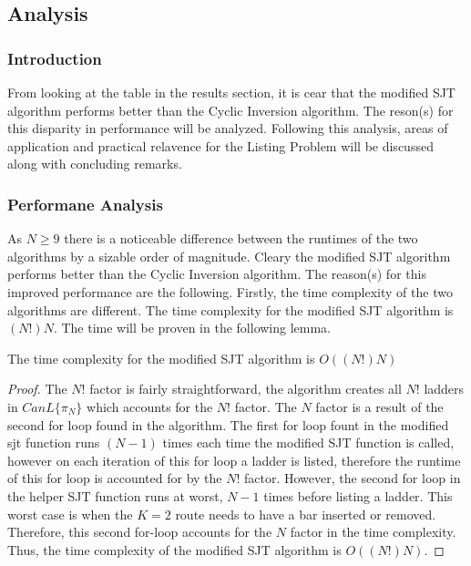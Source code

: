 
\subsection{Analysis}
    \subsubsection{Introduction}
    From looking at the table in the results section, it is cear that the modified SJT algorithm performs 
    better than the Cyclic Inversion algorithm. The reson(s) for this disparity in performance 
    will be analyzed. Following this analysis, areas of application and practical relavence for the Listing Problem 
    will be discussed along with concluding remarks.

\subsubsection{Performane Analysis}
    As $N \geq 9$ there is a noticeable difference between the runtimes of the two algorithms by a sizable order 
    of magnitude. Cleary the modified SJT algorithm performs better than the Cyclic Inversion algorithm. The reason(s) 
    for this improved performance are the following. Firstly, the time complexity of the two algorithms are different. 
    The time complexity for the modified SJT algorithm is $(N!)N$. The time will be proven in the following lemma.
    \begin{lemma}
        The time complexity for the modified SJT algorithm is $O((N!)N)$
    \end{lemma}
    \begin{proof}
        The $N!$ factor is fairly straightforward, the algorithm creates all $N!$ ladders in $CanL\{\pi_{N}\}$ which 
        accounts for the $N!$ factor. The $N$ factor is a result of the second for loop found in the algorithm. The first for loop 
        fount in the modified sjt function runs $(N-1)$ times each time the modified SJT function is called, however on each 
        iteration of this for loop a ladder is listed, therefore the runtime of this for loop is accounted for by the $N!$ factor. However, 
        the second for loop in the helper SJT function runs at worst, $N-1$ times before listing a ladder. This worst case 
        is when the $K=2$ route needs to have a bar inserted or removed. Therefore, this second for-loop accounts for the $N$ factor 
        in the time complexity. Thus, the time complexity of the modified SJT algorithm is $O((N!)N)$.
    \end{proof}

